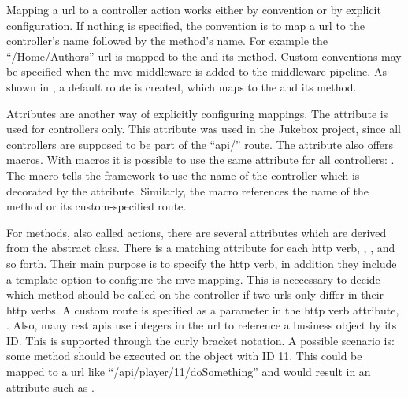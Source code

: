 


Mapping a \gls{url} to a controller action works either by convention or by explicit configuration. If nothing is specified, the convention is to map a \gls{url} to the controller's name followed by the method's name. For example the \enquote{/Home/Authors} \gls{url} is mapped to the  and its  method. Custom conventions may be specified when the \gls{mvc} middleware is added to the middleware pipeline. As shown in , a default route is created, which maps to the  and its  method.


Attributes are another way of explicitly configuring mappings. The \lstcode{[Route]} attribute is used for controllers only. This attribute was used in the Jukebox project, since all controllers are supposed to be part of the \enquote{api/} route. The \lstcode{[Route]} attribute also offers macros. With macros it is possible to use the same attribute for all controllers: . The \lstcode{[controller]} macro tells the framework to use the name of the controller which is decorated by the \lstcode{[Route]} attribute. Similarly, the \lstcode{[action]} macro references the name of the method or its custom-specified route.

For methods, also called actions, there are several attributes which are derived from the abstract  class. There is a matching attribute for each \gls{http} verb, \zB \lstcode{[HttpPost]}, \lstcode{[HttpGet]}, and so forth. Their main purpose is to specify the \gls{http} verb, in addition they include a template option to configure the \gls{mvc} mapping. This is neccessary to decide which method should be called on the controller if two \gls{url}s only differ in their \gls{http} verbs. A custom route is specified as a parameter in the \gls{http} verb attribute, \zB {}. Also, many \gls{rest} \gls{api}s use integers in the \gls{url} to reference a business object by its ID. This is supported through the curly bracket notation. A possible scenario is: some method should be executed on the  object with ID 11. This could be mapped to a \gls{url} like \enquote{/api/player/11/doSomething} and would result in an attribute such as . \\ \cite{mvcRouting}



